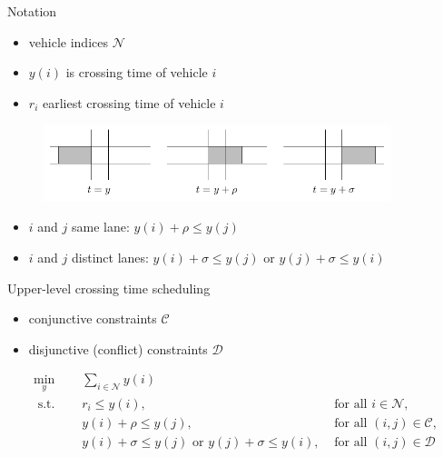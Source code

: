\documentclass[bigger]{beamer}
\begin{document}
\begin{frame}[label={sec:orgd89b698}]{Notation}
\begin{itemize}
\item vehicle indices \(\mathcal{N}\)
\item \(y(i)\) is crossing time of vehicle \(i\)
\item \(r_i\) earliest crossing time of vehicle \(i\)
\end{itemize}

\begin{figure}
  \centering
  \includegraphics[width=0.9\textwidth]{figures/vehicle_crossing.pdf}
\end{figure}

\begin{itemize}
\item \(i\) and \(j\) same lane: \(y(i) + \rho \leq y(j)\)
\item \(i\) and \(j\) distinct lanes: \(y(i) + \sigma \leq y(j)\) or \(y(j) + \sigma \leq y(i)\)
\end{itemize}
\end{frame}
\begin{frame}[label={sec:orga8bc4d1}]{Upper-level crossing time scheduling}
\begin{itemize}
\item conjunctive constraints \(\mathcal{C}\)
\item disjunctive (conflict) constraints \(\mathcal{D}\)
\end{itemize}

\footnotesize
\begin{align*}
  \min_{y} \quad & \sum_{i \in \mathcal{N}} y(i) \\
  \text{ s.t. } \quad & r_{i} \leq y(i) ,  & \text{ for all } i \in \mathcal{N} ,\\
                    & y(i) + \rho \leq y(j) ,  & \text{ for all } (i,j) \in \mathcal{C} , \\
                    & y(i) + \sigma \leq y(j) \text{ or } y(j) + \sigma \leq y(i) , & \text{ for all } (i,j) \in \mathcal{D} \label{eq:disjunctions}
\end{align*}
\end{frame}
\end{document}
